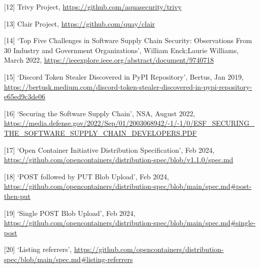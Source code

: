 \documentclass{article}
\begin{document}
  [12] Trivy Project, \url{https://github.com/aquasecurity/trivy}

  [13] Clair Project, \url{https://github.com/quay/clair}
  
  [14] `Top Five Challenges in Software Supply Chain Security: Observations From 30 Industry and Government Organizations', William Enck;Laurie Williams, March 2022, \url{https://ieeexplore.ieee.org/abstract/document/9740718}

  [15] `Discord Token Stealer Discovered in PyPI Repository', Bertus, Jan 2019, \url{https://bertusk.medium.com/discord-token-stealer-discovered-in-pypi-repository-e65ed9c3de06}

  [16] `Securing the Software Supply Chain', NSA, August 2022, \url{https://media.defense.gov/2022/Sep/01/2003068942/-1/-1/0/ESF_SECURING_THE_SOFTWARE_SUPPLY_CHAIN_DEVELOPERS.PDF}

  [17] `Open Container Initiative Distribution Specification', Feb 2024, \url{https://github.com/opencontainers/distribution-spec/blob/v1.1.0/spec.md}

  [18] `POST followed by PUT Blob Upload', Feb 2024, \url{https://github.com/opencontainers/distribution-spec/blob/main/spec.md#post-then-put}

  [19] `Single POST Blob Upload', Feb 2024, \url{https://github.com/opencontainers/distribution-spec/blob/main/spec.md#single-post}

  [20] `Listing referrers', \url{https://github.com/opencontainers/distribution-spec/blob/main/spec.md#listing-referrers}
\end{document}
